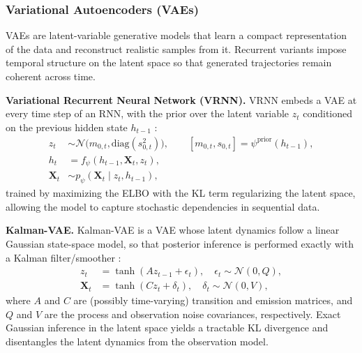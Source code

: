     \subsubsection{Variational Autoencoders (VAEs)}
    VAEs are latent-variable generative models that learn a compact
    representation of the data and reconstruct realistic samples from
    it. Recurrent variants impose temporal structure on the latent
    space so that generated trajectories remain coherent across time.

    \begin{enumerate}[label=\textbf{[A\arabic*]},resume]
      \item \label{alg:vrnn} \textbf{Variational Recurrent Neural
      Network (VRNN).}
      VRNN embeds a VAE at every time step of an RNN, with the prior
      over the latent variable \(z_t\) conditioned on the previous
      hidden state \(h_{t-1}\) \cite{Chung15}:
      \begin{equation}
        \begin{split}
          z_t &\sim \mathcal{N}\big(m_{0,t},
          \mathrm{diag}(s_{0,t}^2)\big), \qquad
          [m_{0,t}, s_{0,t}] = \psi^{\mathrm{prior}}(h_{t-1}), \\
          h_t &= f_\psi(h_{t-1}, \mathbf{X}_t, z_t), \\
          \mathbf{X}_t &\sim p_\psi(\mathbf{X}_t \mid z_t, h_{t-1}),
        \end{split}
        \label{eq:vrnn}
      \end{equation}
      trained by maximizing the ELBO with the KL term regularizing the
      latent space, allowing the model to capture stochastic
      dependencies in sequential data.

      \item \label{alg:kalmanvae} \textbf{Kalman-VAE.}
      Kalman-VAE is a VAE whose latent dynamics follow a linear
      Gaussian state-space model, so that posterior inference is
      performed exactly with a Kalman filter/smoother \cite{Fraccaro17}:
      \begin{equation}
        \begin{split}
          z_t &= \tanh(A z_{t-1} + \epsilon_t),\quad
          \epsilon_t \sim \mathcal{N}(0, Q), \\
          \mathbf{X}_t &= \tanh(C z_t + \delta_t),\quad
          \delta_t \sim \mathcal{N}(0, V),
        \end{split}
        \label{eq:kalmanvae}
      \end{equation}
      where \(A\) and \(C\) are (possibly time-varying) transition
      and emission matrices, and \(Q\) and \(V\) are the process and
      observation noise covariances, respectively. Exact Gaussian
      inference in the latent space yields a tractable KL divergence
      and disentangles the latent dynamics from the observation model.
    \end{enumerate}

